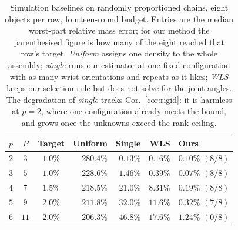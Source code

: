\begin{table}[t]
\caption{Simulation baselines on randomly proportioned chains, eight objects per
row, fourteen-round budget. Entries are the median worst-part relative mass
error; for our method the parenthesised figure is how many of the eight reached
that row's target. \emph{Uniform} assigns one density to the whole assembly;
\emph{single} runs our estimator at one fixed configuration with as many wrist
orientations and repeats as it likes; \emph{WLS} keeps our selection rule but
does not solve for the joint angles. The degradation of \emph{single} tracks
Cor.~\ref{cor:rigid}: it is harmless at $p=2$, where one configuration already
meets the bound, and grows once the unknowns exceed the rank ceiling.}
\label{tab:sim_baselines}
\centering
\scriptsize
\setlength{\tabcolsep}{4pt}
\begin{tabular}{cccrrrl}
\hline
$p$ & $P$ & Target & Uniform & Single & WLS & Ours \\
\hline
$2$ & $3$  & $1.0\%$ & $280.4\%$ & $0.13\%$ & $0.16\%$ & $\mathbf{0.10\%}$ $(8/8)$ \\
$3$ & $5$  & $1.0\%$ & $228.6\%$ & $1.46\%$ & $0.39\%$ & $\mathbf{0.07\%}$ $(8/8)$ \\
$4$ & $7$  & $1.5\%$ & $218.5\%$ & $21.0\%$ & $8.31\%$ & $\mathbf{0.19\%}$ $(8/8)$ \\
$5$ & $9$  & $2.0\%$ & $211.8\%$ & $32.0\%$ & $11.6\%$ & $\mathbf{0.32\%}$ $(7/8)$ \\
$6$ & $11$ & $2.0\%$ & $206.3\%$ & $46.8\%$ & $17.6\%$ & $\mathbf{1.24\%}$ $(0/8)$ \\
\hline
\end{tabular}
\end{table}
